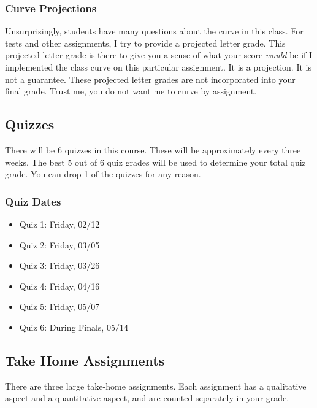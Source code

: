 \documentclass[11pt,]{article}
\begin{document}
\hypertarget{curve-projections}{%
\subsubsection{Curve Projections}\label{curve-projections}}

Unsurprisingly, students have many questions about the curve in this
class. For tests and other assignments, I try to provide a projected
letter grade. This projected letter grade is there to give you a sense
of what your score \emph{would} be if I implemented the class curve on
this particular assignment. It is a projection. It is not a guarantee.
These projected letter grades are not incorporated into your final
grade. Trust me, you do not want me to curve by assignment.

\hypertarget{quizzes}{%
\subsection{Quizzes}\label{quizzes}}

There will be 6 quizzes in this course. These will be approximately
every three weeks. The best 5 out of 6 quiz grades will be used to
determine your total quiz grade. You can drop 1 of the quizzes for any
reason.

\hypertarget{quiz-dates}{%
\subsubsection{Quiz Dates}\label{quiz-dates}}

\begin{itemize}
\item
  Quiz 1: Friday, 02/12
\item
  Quiz 2: Friday, 03/05
\item
  Quiz 3: Friday, 03/26
\item
  Quiz 4: Friday, 04/16
\item
  Quiz 5: Friday, 05/07
\item
  Quiz 6: During Finals, 05/14
\end{itemize}

\hypertarget{take-home-assignments}{%
\subsection{Take Home Assignments}\label{take-home-assignments}}

There are three large take-home assignments. Each assignment has a
qualitative aspect and a quantitative aspect, and are counted separately
in your grade.
\end{document}
